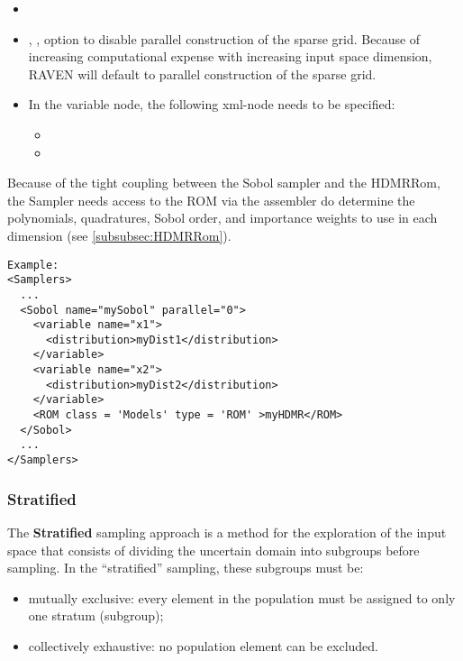 \begin{itemize}
\itemsep0em
\item \nameDescription
\item {}, , option to disable parallel construction of the sparse grid.  Because of increasing computational expense with increasing input space dimension, RAVEN will default to parallel construction of the sparse grid.
\end{itemize}
\begin{itemize}
\item \variableDescription
 In the variable node, the following xml-node needs to be specified:
 \begin{itemize}
    \item \distributionDescription
    \item \functionDescription
 \end{itemize} \end{itemize}
Because of the tight coupling between the Sobol sampler and the HDMRRom, the Sampler needs access to the ROM via the assembler do determine the polynomials, quadratures, Sobol order, and importance weights to use in each dimension (see \ref{subsubsec:HDMRRom}).


\footnotesize
\begin{lstlisting}[style=XML]
Example:
<Samplers>
  ...
  <Sobol name="mySobol" parallel="0">
    <variable name="x1">
      <distribution>myDist1</distribution>
    </variable>
    <variable name="x2">
      <distribution>myDist2</distribution>
    </variable>
    <ROM class = 'Models' type = 'ROM' >myHDMR</ROM>
  </Sobol>
  ...
</Samplers>
\end{lstlisting}
 \normalsize

\subsubsection{Stratified}
\label{subsubsubsec:Stratified}
The \textbf{Stratified} sampling approach is a method for the exploration of the
input space that consists of dividing the uncertain domain into subgroups before
sampling.
%
In the ``stratified'' sampling, these subgroups must be:
\begin{itemize}
 \item mutually exclusive: every element in the population must be assigned to
   only one stratum (subgroup);
 \item collectively exhaustive: no population element can be excluded.
\end{itemize}


